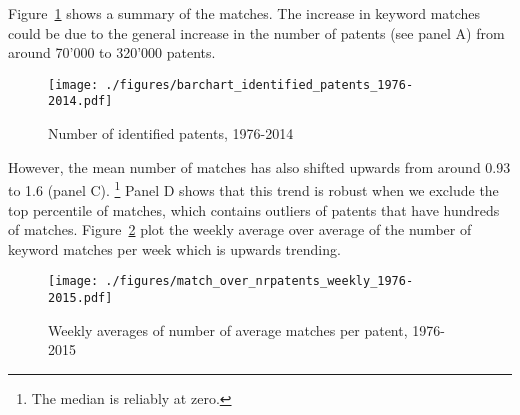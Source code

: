 \documentclass[11pt,a4paper,fleqn]{article}
\begin{document}
Figure~\ref{fig:summary_stats} shows a summary of the matches. The increase in keyword matches could be due to the general increase in the number of patents (see panel A) from around 70'000 to 320'000 patents. 


\begin{figure}[tb]
\caption{Number of identified patents, 1976-2014}
	\texttt{[image: ./figures/barchart\_identified\_patents\_1976-2014.pdf]}
	\label{fig:summary_stats}
\end{figure}





However, the mean number of matches has also shifted upwards from around 0.93 to 1.6 (panel C). \footnote{The median is reliably at zero.} Panel D shows that this trend is robust when we exclude the top percentile of matches, which contains outliers of patents that have hundreds of matches. Figure~\ref{fig:match_per_nrpatents} plot the weekly average over average of the number of keyword matches per week which is upwards trending. 


\begin{figure}[tb]
\caption{Weekly averages of number of average matches per patent, 1976-2015}
	\centering
	\texttt{[image: ./figures/match\_over\_nrpatents\_weekly\_1976-2015.pdf]}
	\label{fig:match_per_nrpatents}
\end{figure}
\end{document}
